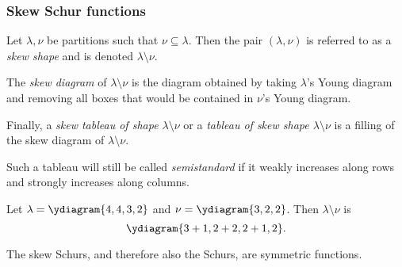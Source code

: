 \documentclass{article}
\begin{document}
\subsubsection{Skew Schur functions}
\begin{definition}
    Let $\lambda, \nu$ be partitions such that $\nu \subseteq \lambda$. Then the pair $(\lambda, \nu)$ is referred to as a \textit{skew shape} and is denoted $\lambda \setminus \nu$.

    The \textit{skew diagram} of $\lambda \setminus \nu$ is the diagram obtained by taking $\lambda$'s Young diagram and removing all boxes that would be contained in $\nu$'s Young diagram.

    Finally, a \textit{skew tableau of shape $\lambda \setminus \nu$} or a \textit{tableau of skew shape $\lambda \setminus \nu$} is a filling of the skew diagram of $\lambda \setminus \nu$. 

    Such a tableau will still be called \textit{semistandard} if it weakly increases along rows and strongly increases along columns.
\end{definition}

\begin{example}
    Let $\lambda = \ydiagram{4,4,3,2}$ and $\nu = \ydiagram{3,2,2}$. Then $\lambda \setminus \nu$ is
    \[\ydiagram{3+1,2+2,2+1,2}.\]
\end{example}

\begin{theorem} The skew Schurs, and therefore also the Schurs, are symmetric functions.
\end{theorem}
\end{document}
